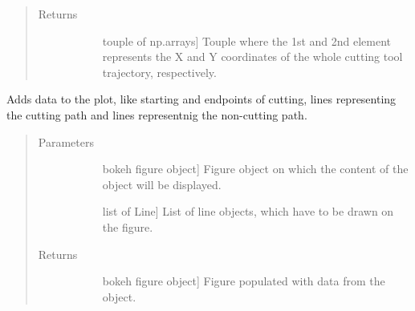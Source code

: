 \documentclass[letterpaper,10pt,english,openany,oneside]{sphinxmanual}
\begin{document}
\begin{fulllineitems}
\begin{fulllineitems}
\begin{quote}
\begin{description}
\item[{Returns}] \leavevmode\begin{description}
\item[{}] \leavevmode{[}touple of np.arrays{]}
Touple where the 1st and 2nd element represents the X and Y
coordinates of the whole cutting tool trajectory, respectively.

\end{description}

\end{description}\end{quote}

\end{fulllineitems}


\begin{fulllineitems}
\label{\detokenize{reference:cnc.visualization.Visualizer.populate_plot}}
Adds data to the plot, like starting and endpoints of cutting, lines
representing the cutting path and lines representnig the non-cutting
path.
\begin{quote}\begin{description}
\item[{Parameters}] \leavevmode\begin{description}
\item[{}] \leavevmode{[}bokeh figure object{]}
Figure object on which the content of the  object will be
displayed.

\item[{}] \leavevmode{[}list of Line{]}
List of line objects, which have to be drawn on the figure.

\end{description}

\item[{Returns}] \leavevmode\begin{description}
\item[{}] \leavevmode{[}bokeh figure object{]}
Figure populated with data from the  object.

\end{description}

\end{description}\end{quote}


\end{fulllineitems}
\end{fulllineitems}
\end{document}
